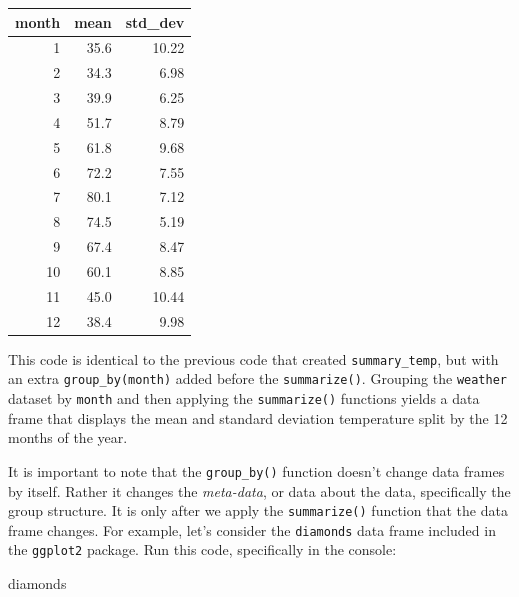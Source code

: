 \documentclass[12pt, krantz2,]{krantz}
\makeatletter
\newenvironment{Shaded}{\begin{snugshade}}{\end{snugshade}}
\newcommand{\NormalTok}[1]{#1}
\newenvironment{kframe}{%
\medskip{}
\setlength{\fboxsep}{.8em}
 \def\at@end@of@kframe{}%
 \ifinner\ifhmode%
  \def\at@end@of@kframe{\end{minipage}}%
  \begin{minipage}{\columnwidth}%
 \fi\fi%
 \def\FrameCommand##1{\hskip\@totalleftmargin \hskip-\fboxsep
 \colorbox{shadecolor}{##1}\hskip-\fboxsep
     \hskip-\linewidth \hskip-\@totalleftmargin \hskip\columnwidth}%
 \MakeFramed {\advance\hsize-\width
   \@totalleftmargin\z@ \linewidth\hsize
   \@setminipage}}%
 {\par\unskip\endMakeFramed%
 \at@end@of@kframe}
\renewenvironment{Shaded}{\begin{kframe}}{\end{kframe}}
\makeatother
\begin{document}
\begin{table}[H]
\centering\begingroup\fontsize{10}{12}\selectfont

\begin{tabular}{r|r|r}
\hline
month & mean & std\_dev\\
\hline
1 & 35.6 & 10.22\\
\hline
2 & 34.3 & 6.98\\
\hline
3 & 39.9 & 6.25\\
\hline
4 & 51.7 & 8.79\\
\hline
5 & 61.8 & 9.68\\
\hline
6 & 72.2 & 7.55\\
\hline
7 & 80.1 & 7.12\\
\hline
8 & 74.5 & 5.19\\
\hline
9 & 67.4 & 8.47\\
\hline
10 & 60.1 & 8.85\\
\hline
11 & 45.0 & 10.44\\
\hline
12 & 38.4 & 9.98\\
\hline
\end{tabular}
\endgroup{}
\end{table}

This code is identical to the previous code that created \texttt{summary\_temp}, but with an extra \texttt{group\_by(month)} added before the \texttt{summarize()}. Grouping the \texttt{weather} dataset by \texttt{month} and then applying the \texttt{summarize()} functions yields a data frame that displays the mean and standard deviation temperature split by the 12 months of the year.

It is important to note that the \texttt{group\_by()} function doesn't change data frames by itself. Rather it changes the \emph{meta-data}, or data about the data, specifically the group structure. It is only after we apply the \texttt{summarize()} function that the data frame changes. For example, let's consider the \texttt{diamonds} data frame included in the \texttt{ggplot2} package. Run this code, specifically in the console:

\begin{Shaded}
\begin{Highlighting}[]
\NormalTok{diamonds}
\end{Highlighting}
\end{Shaded}
\end{document}
